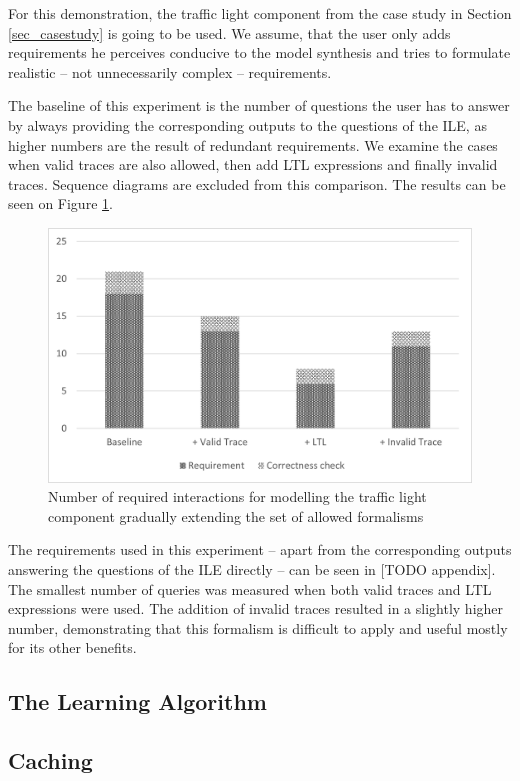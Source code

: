 For this demonstration, the traffic light component from the case study in Section \ref{sec_casestudy} is going to be used. We assume, that the user only adds requirements he perceives conducive to the model synthesis and tries to formulate realistic -- not unnecessarily complex -- requirements. 

The baseline of this experiment is the number of questions the user has to answer by always providing the corresponding outputs to the questions of the ILE, as higher numbers are the result of redundant requirements. We examine the cases when valid traces are also allowed, then add LTL expressions and finally invalid traces. Sequence diagrams are excluded from this comparison. The results can be seen on Figure \ref{fig_eval_trafficlightformalisms}.

\begin{figure}[!ht] 
	\centering
	\includegraphics[width=130mm, keepaspectratio]{figures/evaluation_trafficlightformalism.png}
	\caption{Number of required interactions for modelling the traffic light component gradually extending the set of allowed formalisms} 
	\label{fig_eval_trafficlightformalisms}
\end{figure}

The requirements used in this experiment -- apart from the corresponding outputs answering the questions of the ILE directly -- can be seen in [TODO appendix]. The smallest number of queries was measured when both valid traces and LTL expressions were used. The addition of invalid traces resulted in a slightly higher number, demonstrating that this formalism is difficult to apply and useful mostly for its other benefits.  
 
\subsection{The Learning Algorithm} \label{subs_evallearningalgo}

\subsection{Caching} \label{subs_evalcaching}
